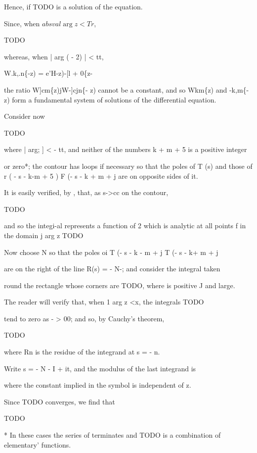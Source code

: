 Hence, if TODO is a solution of the equation.

Since, when $absval{\arg z} < Tr$,

TODO

whereas, when | arg ( - 2) | < tt,

W.k,.n\{-z) = e'H-z)-[l + 0\{z-%

the ratio W]cm\{z)jW-]cjn\{- z) cannot be a constant, and so
Wkm\{z) and -k,m\{- z) form a fundamental system of solutions of
the differential equation.


Consider now

TODO

where | arg; ] < - tt, and neither of the numbers k + m + 5 is a
positive integer

%
%

or zero*; the contour has loops if necessary so that the poles of T
(s) and those of r ( - s - k-m + 5 ) F (- s - k + m + j are on
opposite sides of it.

It is easily verified, by , that, as s->cc on the contour,

TODO

and so the integi-al represents a function of 2 which is analytic at
all points f in the domain j arg z TODO

Now choose N so that the poles oi T (- s - k - m + j T (- s - k+ m +
j

are on the right of the line R(s) = - N-; and consider the integral
taken

round the rectangle whose corners are TODO, where  is
positive J and large.

The reader will verify that, when 1 arg z <x, the integrals TODO

tend to zero as - > 00; and so, by Cauchy's theorem,

TODO

where Rn is the residue of the integrand at s = - n.

Write s = - N - I + it, and the modulus of the last integrand is

where the constant implied in the symbol is independent of z.

Since TODO converges, we find that

TODO

* In these cases the series of  terminates and TODO is a
combination of elementary' functions.

